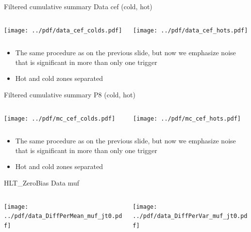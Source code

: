 \documentclass[9pt]{beamer}
\begin{document}
\begin{frame}[t]{Filtered cumulative summary Data cef (cold, hot)}
\begin{columns}[T]
  \begin{column}{.5\textwidth}
  \texttt{[image: ../pdf/data\_cef\_colds.pdf]}
  \end{column}
  \begin{column}{.5\textwidth}
  \texttt{[image: ../pdf/data\_cef\_hots.pdf]}
  \end{column}
\end{columns}
\begin{itemize}
 \item The same procedure as on the previous slide, but now we emphasize noise that is significant in more than only one trigger
 \item Hot and cold zones separated
\end{itemize}
\end{frame}

\begin{frame}[t]{Filtered cumulative summary P8 (cold, hot)}
\begin{columns}[T]
  \begin{column}{.5\textwidth}
  \texttt{[image: ../pdf/mc\_cef\_colds.pdf]}
  \end{column}
  \begin{column}{.5\textwidth}
  \texttt{[image: ../pdf/mc\_cef\_hots.pdf]}
  \end{column}
\end{columns}
\begin{itemize}
 \item The same procedure as on the previous slide, but now we emphasize noise that is significant in more than only one trigger
 \item Hot and cold zones separated
\end{itemize}
\end{frame}


\begin{frame}[t]{HLT\_ZeroBias Data muf}
\begin{columns}[T]
  \begin{column}{.5\textwidth}
  \texttt{[image: ../pdf/data\_DiffPerMean\_muf\_jt0.pdf]}
  \end{column}
  \begin{column}{.5\textwidth}
  \texttt{[image: ../pdf/data\_DiffPerVar\_muf\_jt0.pdf]}
  \end{column}
\end{columns}
\end{frame}
\end{document}
